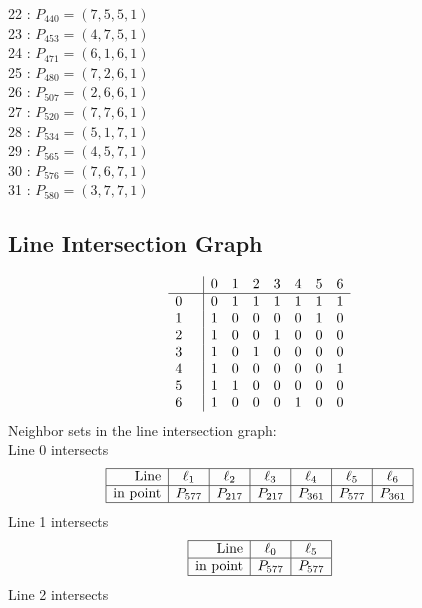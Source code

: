 \documentclass{article}
\begin{document}
{\begin{multicols}{2}
22 : $P_{440}=( 7, 5, 5, 1 )$\\
23 : $P_{453}=( 4, 7, 5, 1 )$\\
24 : $P_{471}=( 6, 1, 6, 1 )$\\
25 : $P_{480}=( 7, 2, 6, 1 )$\\
26 : $P_{507}=( 2, 6, 6, 1 )$\\
27 : $P_{520}=( 7, 7, 6, 1 )$\\
28 : $P_{534}=( 5, 1, 7, 1 )$\\
29 : $P_{565}=( 4, 5, 7, 1 )$\\
30 : $P_{576}=( 7, 6, 7, 1 )$\\
31 : $P_{580}=( 3, 7, 7, 1 )$\\
\end{multicols}
\subsection*{Line Intersection Graph}
{\arraycolsep=1pt
$$
\begin{array}{rr|*{7}r}
 &  & 0 & 1 & 2 & 3 & 4 & 5 & 6\\
\hline
0 &  & 0 & 1 & 1 & 1 & 1 & 1 & 1\\
1 &  & 1 & 0 & 0 & 0 & 0 & 1 & 0\\
2 &  & 1 & 0 & 0 & 1 & 0 & 0 & 0\\
3 &  & 1 & 0 & 1 & 0 & 0 & 0 & 0\\
4 &  & 1 & 0 & 0 & 0 & 0 & 0 & 1\\
5 &  & 1 & 1 & 0 & 0 & 0 & 0 & 0\\
6 &  & 1 & 0 & 0 & 0 & 1 & 0 & 0\\
\end{array}
$$
}%
Neighbor sets in the line intersection graph:\\
Line 0 intersects 
$$
\begin{array}{|r*{6}{|c}|}
\hline
\mbox{Line}  & \ell_{1} & \ell_{2} & \ell_{3} & \ell_{4} & \ell_{5} & \ell_{6}\\
\hline
\mbox{in point}  & P_{577} & P_{217} & P_{217} & P_{361} & P_{577} & P_{361}\\
\hline
\end{array}
$$
Line 1 intersects 
$$
\begin{array}{|r*{2}{|c}|}
\hline
\mbox{Line}  & \ell_{0} & \ell_{5}\\
\hline
\mbox{in point}  & P_{577} & P_{577}\\
\hline
\end{array}
$$
Line 2 intersects 
$$
\begin{array}{|r*{2}{|c}|}

\end{array}$$}
\end{document}
